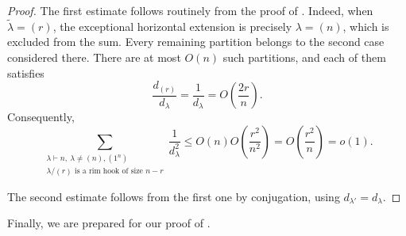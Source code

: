 \begin{proof}
The first estimate follows routinely from the proof of . Indeed, when $\widetilde\lambda=(r)$, the exceptional horizontal extension is precisely $\lambda=(n)$, which is excluded from the sum. Every remaining partition belongs to the second case considered there. There are at most $O(n)$ such partitions, and each of them satisfies
$$
\frac{d_{(r)}}{d_\lambda}=\frac{1}{d_\lambda}
=O\left(\frac{2r}{n}\right).
$$
Consequently,
$$
\sum_{\substack{\lambda\vdash n,\ \lambda\neq(n),(1^n)\\
\lambda/(r)\text{ is a rim hook of size }n-r}}
\frac{1}{d_\lambda^2}
\le O(n)O\left(\frac{r^2}{n^2}\right)=O\left(\frac{r^2}{n}\right)=o(1).
$$

The second estimate follows from the first one by conjugation, using
$d_{\lambda'}=d_\lambda$.
\end{proof}

Finally, we are prepared for our proof of .

